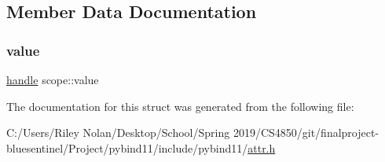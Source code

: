 \subsection{Member Data Documentation}
\mbox{\label{structscope_a3e53212de1c4692bf00cdba2e613458e}} 
\subsubsection{\texorpdfstring{value}{value}}
{\footnotesize\ttfamily \mbox{\hyperlink{classhandle}{handle}} scope\+::value}



The documentation for this struct was generated from the following file\+:\begin{DoxyCompactItemize}
\item 
C\+:/\+Users/\+Riley Nolan/\+Desktop/\+School/\+Spring 2019/\+C\+S4850/git/finalproject-\/bluesentinel/\+Project/pybind11/include/pybind11/\mbox{\hyperlink{attr_8h}{attr.\+h}}\end{DoxyCompactItemize}

